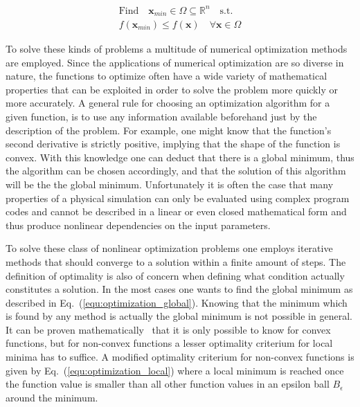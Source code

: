 \documentclass[a4paper,10pt]{article}
\renewcommand{\vec}[1]{\mathbf{#1}}
\newcommand{\equref}[1]{Eq.~(\ref{#1})}
\begin{document}
    \begin{equation}
        \label{equ:optimization_global}
        \begin{gathered}
        \text{Find} \quad \vec{x}_{min} \in \Omega \subseteq \mathbb{R}^n \quad \text{s.t.}\\
        f(\vec{x}_{min}) \leq f(\vec{x}) \quad \forall \vec{x} \in \Omega
        \end{gathered} 
    \end{equation}

    To solve these kinds of problems a multitude of numerical
    optimization methods are employed.
    Since the applications of numerical optimization are so diverse
    in nature, the functions to optimize often have a wide variety
    of mathematical properties that can be exploited in order to solve
    the problem more quickly or more accurately.
    A general rule for choosing an optimization algorithm for a given
    function, is to use any information available beforehand just by the
    description of the problem.
    For example, one might know that the function's second derivative is
    strictly positive, implying that the shape of the function is convex.
    With this knowledge one can deduct that there is a global minimum, 
    thus the algorithm can be chosen accordingly, and that the 
    solution of this algorithm will be the the global minimum.
    Unfortunately it is often the case that many properties of a 
    physical simulation can only be evaluated using
    complex program codes and cannot be described in a linear or 
    even closed mathematical form and thus produce nonlinear
    dependencies on the input parameters.

    To solve these class of nonlinear optimization problems one employs
    iterative methods that should converge to a solution within a
    finite amount of steps.
    The definition of optimality is also of concern when defining
    what condition actually constitutes a solution.
    In the most cases one wants to find the global minimum as described
    in \equref{equ:optimization_global}.
    Knowing that the minimum which is found by any method is actually
    the global minimum is not possible in general.
    It can be proven mathematically~\cite{solomon_numerical} that it is only possible to know
    for convex functions, but for non-convex
    functions a lesser optimality criterium for local minima has to suffice.
    A modified optimality criterium for non-convex functions is given
    by \equref{equ:optimization_local} where a local minimum is reached
    once the function value is smaller than all other function values 
    in an epsilon ball $B_{\epsilon}$ around the minimum.
\end{document}
